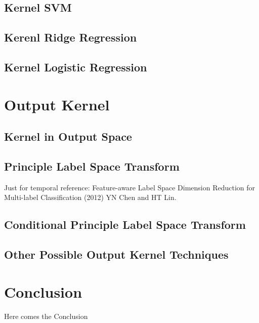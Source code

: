 \documentclass[12pt]{article}
\theoremstyle{definition}
\theoremstyle{remark}
\begin{document}
\subsection{Kernel SVM}
\subsection{Kerenl Ridge Regression}
\subsection{Kernel Logistic Regression}

\section{Output Kernel}
\subsection{Kernel in Output Space}
\subsection{Principle Label Space Transform}
Just for temporal reference: Feature-aware Label Space Dimension Reduction for Multi-label Classification (2012) YN Chen and HT Lin.
\subsection{Conditional Principle Label Space Transform}
\subsection{Other Possible Output Kernel Techniques}

\section{Conclusion}
Here comes the Conclusion






\end{document}

